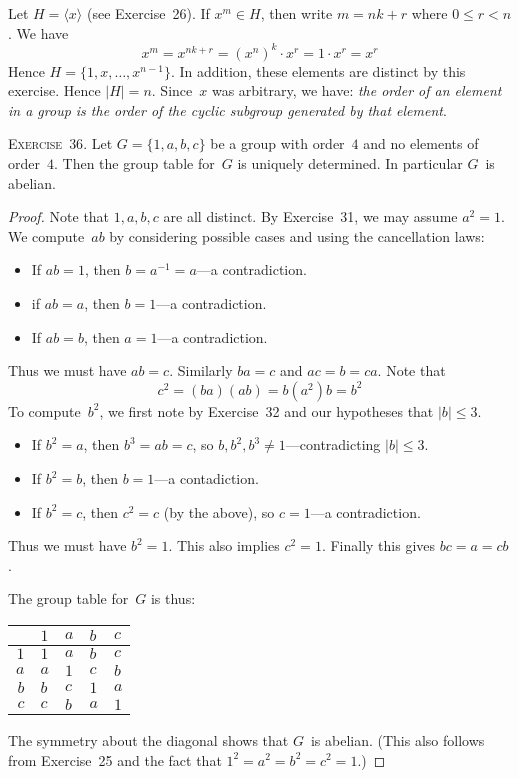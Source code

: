 \documentclass[letterpaper]{article}
\newcommand{\exercise}[1]{\goodbreak\noindent\textsc{Exercise~{#1}.}}
\newcommand{\ord}[1]{|{#1}|}
\newcommand{\cyc}[1]{\langle{#1}\rangle}
\begin{document}
Let $H=\cyc{x}$ (see Exercise~26). If $x^m\in H$, then write $m=nk+r$ where $0\le r<n$. We have
$$x^m=x^{nk+r}=(x^n)^k\cdot x^r=1\cdot x^r=x^r$$
Hence $H=\{1,x,\ldots,x^{n-1}\}$. In addition, these elements are distinct by this exercise. Hence $\ord{H}=n$. Since~$x$ was arbitrary, we have: \emph{the order of an element in a group is the order of the cyclic subgroup generated by that element}.

\bigskip
\exercise{36}
Let $G=\{1,a,b,c\}$ be a group with order~$4$ and no elements of order~$4$. Then the group table for~$G$ is uniquely determined. In particular $G$~is abelian.
\begin{proof}
Note that $1,a,b,c$ are all distinct. By Exercise~31, we may assume $a^2=1$. We compute~$ab$ by considering possible cases and using the cancellation laws:
\begin{itemize}[itemsep=0pt]
\item If $ab=1$, then $b=a^{-1}=a$---a contradiction.
\item if $ab=a$, then $b=1$---a contradiction.
\item If $ab=b$, then $a=1$---a contradiction.
\end{itemize}
Thus we must have $ab=c$. Similarly $ba=c$ and $ac=b=ca$. Note that
$$c^2=(ba)(ab)=b(a^2)b=b^2$$
To compute~$b^2$, we first note by Exercise~32 and our hypotheses that $\ord{b}\le 3$.
\begin{itemize}[itemsep=0pt]
\item If $b^2=a$, then $b^3=ab=c$, so $b,b^2,b^3\ne 1$---contradicting $\ord{b}\le 3$.
\item If $b^2=b$, then $b=1$---a contadiction.
\item If $b^2=c$, then $c^2=c$ (by the above), so $c=1$---a contradiction.
\end{itemize}
Thus we must have $b^2=1$. This also implies $c^2=1$. Finally this gives $bc=a=cb$.

The group table for~$G$ is thus:
\begin{center}
\begin{tabular}{r|llll}
   &$1$&$a$&$b$&$c$\\
\hline
$1$&$1$&$a$&$b$&$c$\\
$a$&$a$&$1$&$c$&$b$\\
$b$&$b$&$c$&$1$&$a$\\
$c$&$c$&$b$&$a$&$1$
\end{tabular}
\end{center}
The symmetry about the diagonal shows that $G$~is abelian. (This also follows from Exercise~25 and the fact that $1^2=a^2=b^2=c^2=1$.)
\end{proof}
\end{document}
